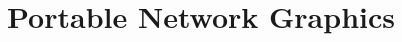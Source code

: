 \begin{comment}
  
\end{comment}

\chapter{Portable Network Graphics}
\label{cha:png}

\begin{refsection}


\end{refsection}